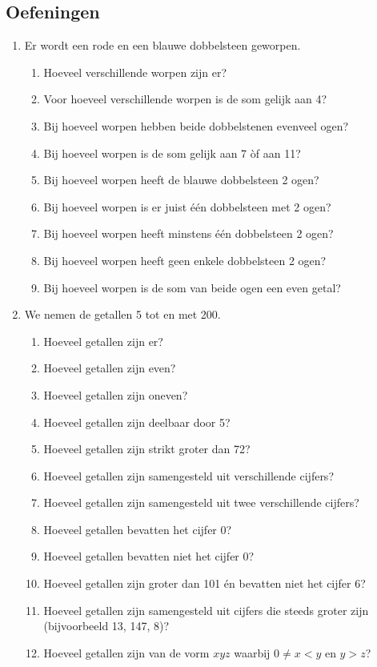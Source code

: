 \subsection{Oefeningen}
\begin{enumerate}
\item Er wordt een rode en een blauwe dobbelsteen geworpen.
\begin{enumerate}
\item Hoeveel verschillende worpen zijn er?
\item Voor hoeveel verschillende worpen is de som gelijk aan 4?
\item Bij hoeveel worpen hebben beide dobbelstenen evenveel ogen?
\item Bij hoeveel worpen is de som gelijk aan 7 òf aan 11?
\item Bij hoeveel worpen heeft de blauwe dobbelsteen 2 ogen?
\item Bij hoeveel worpen is er juist één dobbelsteen met 2 ogen?
\item Bij hoeveel worpen heeft minstens één dobbelsteen 2 ogen?
\item Bij hoeveel worpen heeft geen enkele dobbelsteen 2 ogen?
\item Bij hoeveel worpen is de som van beide ogen een even getal?
\end{enumerate}

\item We nemen de getallen 5 tot en met 200.
\begin{enumerate}
\item Hoeveel getallen zijn er?
\item Hoeveel getallen zijn even?
\item Hoeveel getallen zijn oneven?
\item Hoeveel getallen zijn deelbaar door 5?
\item Hoeveel getallen zijn strikt groter dan 72?
\item Hoeveel getallen zijn samengesteld uit verschillende cijfers?
\item Hoeveel getallen zijn samengesteld uit twee verschillende cijfers?
\item Hoeveel getallen bevatten het cijfer 0?
\item Hoeveel getallen bevatten niet het cijfer 0?
\item Hoeveel getallen zijn groter dan 101 én bevatten niet het cijfer 6?
\item Hoeveel getallen zijn samengesteld uit cijfers die steeds groter zijn (bijvoorbeeld 13, 147, 8)?
\item Hoeveel getallen zijn van de vorm $xyz$ waarbij $0\neq x< y$ en $y>z$?
\end{enumerate}


\end{enumerate}

